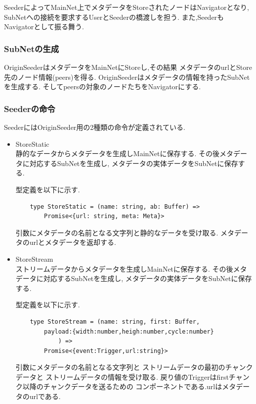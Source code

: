 \documentclass[sotsuron]{jcsie}
\begin{document}
SeederによってMainNet上でメタデータをStoreされたノードはNavigatorとなり,
SubNetへの接続を要求するUserとSeederの橋渡しを担う.
また,SeederもNavigatorとして振る舞う.


\subsubsection{SubNetの生成}
OriginSeederはメタデータをMainNetにStoreし,その結果
メタデータのurlとStore先のノード情報(peers)を得る.
OriginSeederはメタデータの情報を持ったSubNetを生成する.
そしてpeersの対象のノードたちをNavigatorにする.

\subsubsection{Seederの命令}
SeederにはOriginSeeder用の2種類の命令が定義されている.
\begin{itemize}
	\item{StoreStatic} \\
	静的なデータからメタデータを生成しMainNetに保存する.
	その後メタデータに対応するSubNetを生成し,
	メタデータの実体データをSubNetに保存する.
					
	型定義を以下に示す.
	\begin{lstlisting}
	type StoreStatic = (name: string, ab: Buffer) =>
		Promise<{url: string, meta: Meta}>
	\end{lstlisting}
					
	引数にメタデータの名前となる文字列と静的なデータを受け取る.
	メタデータのurlとメタデータを返却する.
				
	\item {StoreStream}\\
	      ストリームデータからメタデータを生成しMainNetに保存する.
	      その後メタデータに対応するSubNetを生成し,
	      メタデータの実体データをSubNetに保存する.
	      	      	      	      
	      型定義を以下に示す.
	      \begin{lstlisting}
	type StoreStream = (name: string, first: Buffer,
		payload:{width:number,heigh:number,cycle:number}
			) =>
		Promise<{event:Trigger,url:string}>
	      \end{lstlisting}
	      	      	      	      
	      引数にメタデータの名前となる文字列と
	      ストリームデータの最初のチャンクデータと
	      ストリームデータの情報を受け取る.
	      戻り値のTriggerはfirstチャンク以降のチャンクデータを送るための
	      コンポーネントである.urlはメタデータのurlである.
\end{itemize}
\end{document}
